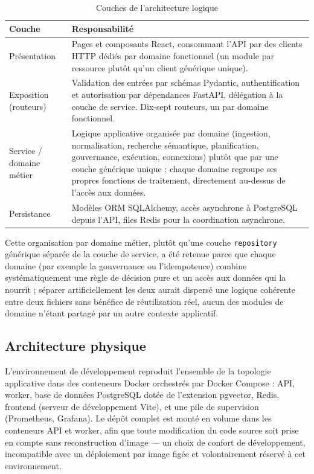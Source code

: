 \begin{table}[H]
  \centering
  \caption{Couches de l'architecture logique}
  \label{tab:couches-logiques}
  \begin{tabularx}{\textwidth}{L{4cm}Y}
    Couche & Responsabilité \\
    \hline
    Présentation & Pages et composants React, consommant l'API par des clients HTTP dédiés par domaine fonctionnel (un module par ressource plutôt qu'un client générique unique). \\
    \hline
    Exposition (routeurs) & Validation des entrées par schémas Pydantic, authentification et autorisation par dépendances FastAPI, délégation à la couche de service. Dix-sept routeurs, un par domaine fonctionnel. \\
    \hline
    Service / domaine métier & Logique applicative organisée par domaine (ingestion, normalisation, recherche sémantique, planification, gouvernance, exécution, connexions) plutôt que par une couche générique unique : chaque domaine regroupe ses propres fonctions de traitement, directement au-dessus de l'accès aux données. \\
    \hline
    Persistance & Modèles ORM SQLAlchemy, accès asynchrone à PostgreSQL depuis l'API, files Redis pour la coordination asynchrone. \\
    \hline
  \end{tabularx}
\end{table}

Cette organisation par domaine métier, plutôt qu'une couche \texttt{repository} générique séparée de la couche de service, a été retenue parce que chaque domaine (par exemple la gouvernance ou l'idempotence) combine systématiquement une règle de décision pure et un accès aux données qui la nourrit ; séparer artificiellement les deux aurait dispersé une logique cohérente entre deux fichiers sans bénéfice de réutilisation réel, aucun des modules de domaine n'étant partagé par un autre contexte applicatif.

\subsection{Architecture physique}

L'environnement de développement reproduit l'ensemble de la topologie applicative dans des conteneurs Docker orchestrés par Docker Compose : API, worker, base de données PostgreSQL dotée de l'extension pgvector, Redis, frontend (serveur de développement Vite), et une pile de supervision (Prometheus, Grafana). Le dépôt complet est monté en volume dans les conteneurs API et worker, afin que toute modification du code source soit prise en compte sans reconstruction d'image — un choix de confort de développement, incompatible avec un déploiement par image figée et volontairement réservé à cet environnement.

